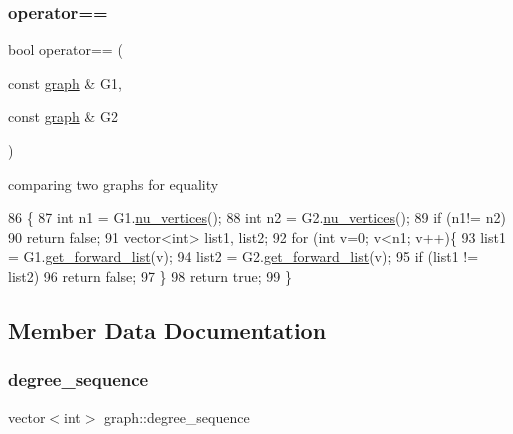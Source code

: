 \subsubsection{\texorpdfstring{operator==}{operator==}}
{\footnotesize\ttfamily bool operator== (\begin{DoxyParamCaption}\item[{const \hyperlink{classgraph}{graph} \&}]{G1,  }\item[{const \hyperlink{classgraph}{graph} \&}]{G2 }\end{DoxyParamCaption})\hspace{0.3cm}{\ttfamily [friend]}}



comparing two graphs for equality 


\begin{DoxyCode}
86 \{
87   \textcolor{keywordtype}{int} n1 = G1.\hyperlink{classgraph_a70a6e0e4e0a874ab122405abd38f83cd}{nu\_vertices}();
88   \textcolor{keywordtype}{int} n2 = G2.\hyperlink{classgraph_a70a6e0e4e0a874ab122405abd38f83cd}{nu\_vertices}();
89   \textcolor{keywordflow}{if} (n1!= n2)
90     \textcolor{keywordflow}{return} \textcolor{keyword}{false};
91   vector<int> list1, list2;
92   \textcolor{keywordflow}{for} (\textcolor{keywordtype}{int} v=0; v<n1; v++)\{
93     list1 = G1.\hyperlink{classgraph_aa8fbee52a7b3604dbbd9175040c7ead5}{get\_forward\_list}(v);
94     list2 = G2.\hyperlink{classgraph_aa8fbee52a7b3604dbbd9175040c7ead5}{get\_forward\_list}(v);
95     \textcolor{keywordflow}{if} (list1 != list2)
96       \textcolor{keywordflow}{return} \textcolor{keyword}{false};
97   \}
98   \textcolor{keywordflow}{return} \textcolor{keyword}{true};
99 \}
\end{DoxyCode}


\subsection{Member Data Documentation}
\mbox{\label{classgraph_a0b31295672bfe37669c9eb3640977fe6}} 
\subsubsection{\texorpdfstring{degree\+\_\+sequence}{degree\_sequence}}
{\footnotesize\ttfamily vector$<$int$>$ graph\+::degree\+\_\+sequence\hspace{0.3cm}{\ttfamily [private]}}



